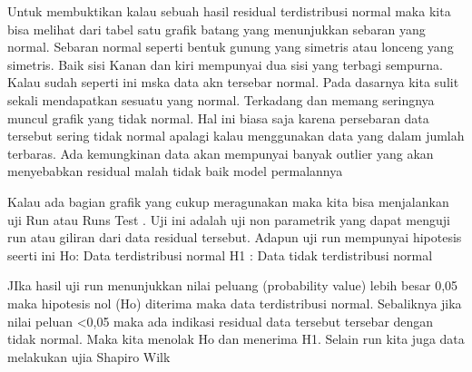 \documentclass[
]{book}
\theoremstyle{definition}
\theoremstyle{definition}
\theoremstyle{definition}
\theoremstyle{definition}
\theoremstyle{remark}
\begin{document}
Untuk membuktikan kalau sebuah hasil residual terdistribusi normal maka kita bisa melihat dari tabel satu grafik batang yang menunjukkan sebaran yang normal. Sebaran normal seperti bentuk gunung yang simetris atau lonceng yang simetris. Baik sisi Kanan dan kiri mempunyai dua sisi yang terbagi sempurna. Kalau sudah seperti ini mska data akn tersebar normal. Pada dasarnya kita sulit sekali mendapatkan sesuatu yang normal. Terkadang dan memang seringnya muncul grafik yang tidak normal. Hal ini biasa saja karena persebaran data tersebut sering tidak normal apalagi kalau menggunakan data yang dalam jumlah terbaras. Ada kemungkinan data akan mempunyai banyak outlier yang akan menyebabkan residual malah tidak baik model permalannya

Kalau ada bagian grafik yang cukup meragunakan maka kita bisa menjalankan uji Run atau Runs Test . Uji ini adalah uji non parametrik yang dapat menguji run atau giliran dari data residual tersebut. Adapun uji run mempunyai hipotesis seerti ini
Ho: Data terdistribusi normal
H1 : Data tidak terdistribusi normal

JIka hasil uji run menunjukkan nilai peluang (probability value) lebih besar 0,05 maka hipotesis nol (Ho) diterima maka data terdistribusi normal. Sebaliknya jika nilai peluan \textless0,05 maka ada indikasi residual data tersebut tersebar dengan tidak normal. Maka kita menolak Ho dan menerima H1.
Selain run kita juga data melakukan ujia Shapiro Wilk

  
\end{document}

